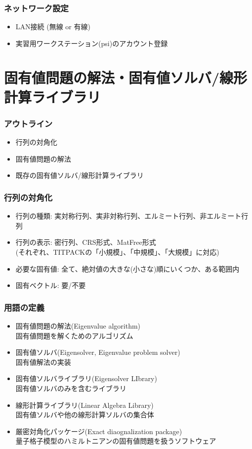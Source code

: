 \begin{frame}
  \frametitle{ネットワーク設定}
  \begin{itemize}
    \setlength{\itemsep}{1em}
  \item LAN接続 (無線 or 有線)
  \item 実習用ワークステーション(psi)のアカウント登録
  \end{itemize}
\end{frame}

\section{固有値問題の解法・固有値ソルバ/線形計算ライブラリ}

\begin{frame}
  \frametitle{アウトライン}
  \begin{itemize}
  \item 行列の対角化
  \item 固有値問題の解法
  \item 既存の固有値ソルバ/線形計算ライブラリ
  \end{itemize}
\end{frame}

\begin{frame}
  \frametitle{行列の対角化}
  \begin{itemize}
    \setlength{\itemsep}{1em}
  \item 行列の種類: 実対称行列、実非対称行列、エルミート行列、非エルミート行列
  \item 行列の表示: 密行列、CRS形式、MatFree形式 \\
    (それぞれ、TITPACKの「小規模」、「中規模」、「大規模」に対応)
  \item 必要な固有値: 全て、絶対値の大きな(小さな)順にいくつか、ある範囲内
  \item 固有ベクトル: 要/不要
  \end{itemize}
\end{frame}

\begin{frame}
  \frametitle{用語の定義}
  \begin{itemize}
  \item 固有値問題の解法(Eigenvalue algorithm) \\
    固有値問題を解くためのアルゴリズム
  \item 固有値ソルバ(Eigensolver, Eigenvalue problem solver) \\
    固有値解法の実装
  \item 固有値ソルバライブラリ(Eigensolver LIbrary) \\
    固有値ソルバのみを含むライブラリ
  \item 線形計算ライブラリ(Linear Algebra Library) \\
    固有値ソルバや他の線形計算ソルバの集合体
  \item 厳密対角化パッケージ(Exact diaognalization package) \\
    量子格子模型のハミルトニアンの固有値問題を扱うソフトウェア
  \end{itemize}
\end{frame}

